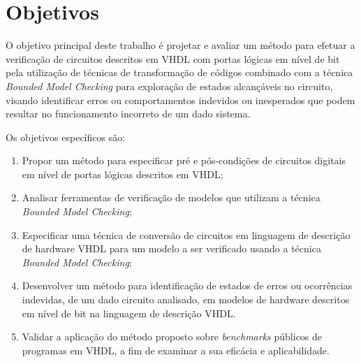 \section{Objetivos}

O objetivo principal deste trabalho é projetar e avaliar um método para efetuar a verificação de circuitos descritos em VHDL com portas lógicas em nível de bit pela utilização de técnicas de transformação de códigos combinado com a técnica \textit{Bounded Model Checking} para exploração de estados alcançáveis no circuito, visando identificar erros ou comportamentos indevidos ou inesperados que podem resultar no funcionamento incorreto de um dado sistema.

Os objetivos específicos são:
\begin{enumerate}
  \item Propor um método para especificar pré e pós-condições de circuitos digitais em nível de portas lógicas descritos em VHDL;
  \item Analisar ferramentas de verificação de modelos que utilizam a técnica \textit{Bounded Model Checking};
  \item Especificar uma técnica de conversão de circuitos em linguagem de descrição de hardware VHDL para um modelo a ser verificado usando a técnica \textit{Bounded Model Checking};
   \item Desenvolver um método para identificação de estados de erros ou ocorrências indevidas, de um dado circuito analisado, em modelos de hardware descritos em nível de bit na linguagem de descrição VHDL.
  \item Validar a aplicação do método proposto sobre \textit{benchmarks} públicos de programas em VHDL, a fim de examinar a sua eficácia e aplicabilidade.
\end{enumerate}

